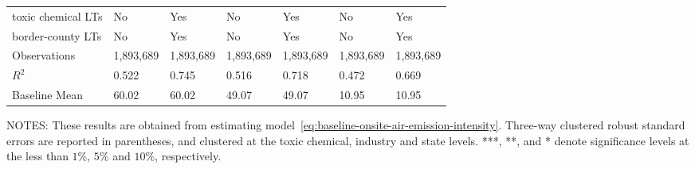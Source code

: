 \begin{table}[H]
{\begin{tabular}{@{}lllllll@{}}
            toxic chemical LTs            & No        & Yes       & No        & Yes       & No        & Yes       \\
            border-county LTs             & No        & Yes       & No        & Yes       & No        & Yes       \\ \midrule
            Observations                  & 1,893,689 & 1,893,689 & 1,893,689 & 1,893,689 & 1,893,689 & 1,893,689 \\
            $R^2$                         & 0.522     & 0.745     & 0.516     & 0.718     & 0.472     & 0.669     \\
            Baseline Mean                 & 60.02     & 60.02     & 49.07     & 49.07     & 10.95     & 10.95     \\ \bottomrule\bottomrule
        \end{tabular}%
    }
    \begin{minipage}{\columnwidth}
        \vspace{0.05in}
        \tiny NOTES: These results are obtained from estimating model~\ref{eq:baseline-onsite-air-emission-intensity}. Three-way clustered robust standard errors are reported in parentheses, and clustered at the toxic chemical, industry and state levels. ***, **, and * denote significance levels at the less than $1\%$, $5\%$ and $10\%$, respectively.
    \end{minipage}
\end{table}